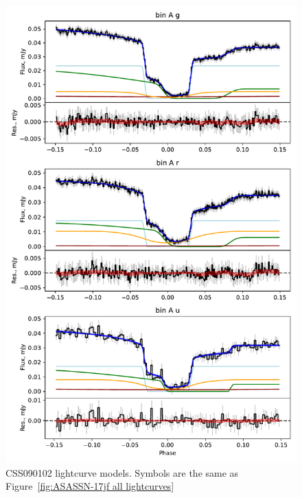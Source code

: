 \begin{figure}
    \centering
    \includegraphics[width=\textwidth]{figures/results/CSS090102/CSS090102_1.pdf}
    \caption{CSS090102 lightcurve models. Symbols are the same as Figure~\ref{fig:ASASSN-17jf all lightcurves}}
    \label{fig:CSS090102 all lightcurves}
\end{figure}



